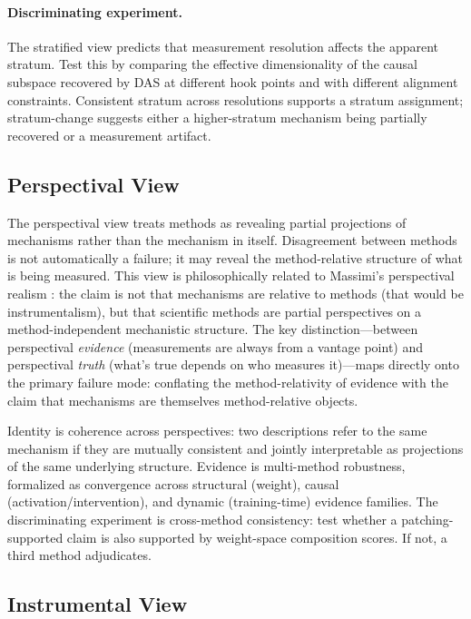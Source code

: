 \documentclass{article}
\begin{document}
\paragraph{Discriminating experiment.}
The stratified view predicts that measurement resolution affects the
apparent stratum.  Test this by comparing the effective dimensionality
of the causal subspace recovered by DAS at different hook points and
with different alignment constraints.  Consistent stratum across
resolutions supports a stratum assignment; stratum-change suggests
either a higher-stratum mechanism being partially recovered or a
measurement artifact.

\subsection{Perspectival View}

The perspectival view treats methods as revealing partial projections of
mechanisms rather than the mechanism in itself.  Disagreement between
methods is not automatically a failure; it may reveal the method-relative
structure of what is being measured.  This view is philosophically related
to Massimi's perspectival realism \citep{massimi2022}: the claim is not
that mechanisms are relative to methods (that would be instrumentalism),
but that scientific methods are partial perspectives on a
method-independent mechanistic structure.  The key distinction---between
perspectival \emph{evidence} (measurements are always from a vantage
point) and perspectival \emph{truth} (what's true depends on who measures
it)---maps directly onto the primary failure mode: conflating the
method-relativity of evidence with the claim that mechanisms are
themselves method-relative objects.

Identity is coherence across perspectives: two descriptions refer to the
same mechanism if they are mutually consistent and jointly interpretable
as projections of the same underlying structure.  Evidence is
multi-method robustness, formalized as
convergence across structural (weight), causal (activation/intervention),
and dynamic (training-time) evidence families.  The discriminating
experiment is cross-method consistency: test whether a patching-supported
claim is also supported by weight-space composition scores.  If not,
a third method adjudicates.

\subsection{Instrumental View}
\end{document}
